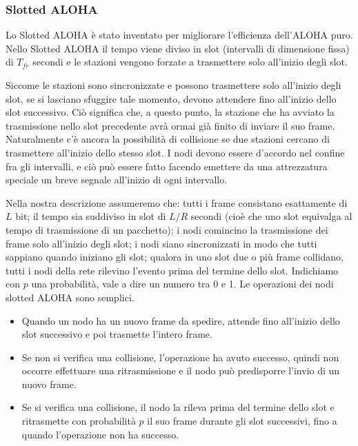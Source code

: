 \subsubsection{Slotted ALOHA}
Lo Slotted ALOHA è stato inventato per migliorare l'efficienza dell'ALOHA puro. Nello Slotted ALOHA il tempo viene diviso in slot (intervalli di dimensione fissa) di $T_{fr}$ secondi e le stazioni vengono forzate a trasmettere solo all'inizio degli slot.

Siccome le stazioni sono sincronizzate e possono trasmettere solo all'inizio degli slot, se si lasciano sfuggire tale momento, devono attendere fino all'inizio dello slot successivo. Ciò significa che, a questo punto, la stazione che ha avviato la trasmissione nello slot precedente avrà ormai già finito di inviare il suo frame. Naturalmente c'è ancora la possibilità di collisione se due stazioni cercano di trasmettere all'inizio dello stesso slot.
I nodi devono essere d'accordo nel confine fra gli intervalli, e ciò può essere fatto facendo emettere da una attrezzatura speciale un breve segnale all'inizio di ogni intervallo.

Nella nostra descrizione assumeremo che: tutti i frame consistano esattamente di $L$ bit; il tempo sia suddiviso in slot di $L/R$ secondi (cioè che uno slot equivalga al tempo di trasmissione di un pacchetto); i nodi comincino la trasmissione dei frame solo all’inizio degli slot; i nodi siano sincronizzati in modo che tutti sappiano quando iniziano gli slot; qualora in uno slot due o più frame collidano, tutti i nodi della rete rilevino l’evento prima del termine dello slot. Indichiamo con $p$ una probabilità, vale a dire un numero tra 0 e 1. Le operazioni dei nodi slotted ALOHA sono semplici.
\begin{itemize}
    \item Quando un nodo ha un nuovo frame da spedire, attende fino all’inizio dello slot successivo e poi trasmette l’intero frame.
    \item Se non si verifica una collisione, l’operazione ha avuto successo, quindi non occorre effettuare una ritrasmissione e il nodo può predisporre l’invio di un nuovo frame.
    \item Se si verifica una collisione, il nodo la rileva prima del termine dello slot e ritrasmette con probabilità $p$ il suo frame durante gli slot successivi, fino a quando l’operazione non ha successo.
\end{itemize}

